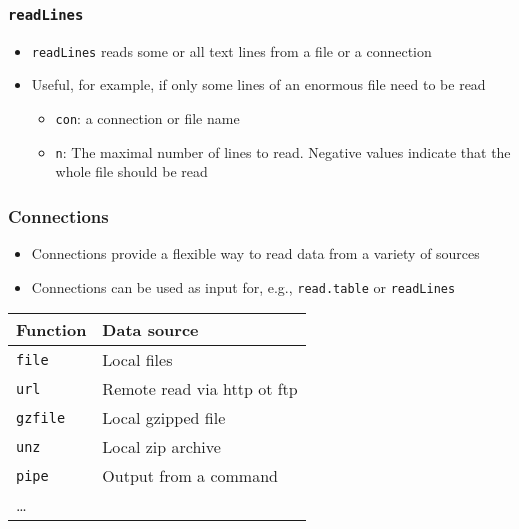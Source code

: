 \documentclass[paper=screen,mathserif]{beamer}\usepackage[]{graphicx}\usepackage[]{color}
\newcommand{\ft}[1]{\frametitle{#1}}
\begin{document}
\begin{frame}[fragile]
  \ft{{\tt readLines}}
  \begin{itemize}
  \item {\tt readLines} reads some or all text lines from a file or a
    connection
  \item Useful, for example, if only some lines of an enormous file
    need to be read
    \begin{itemize}
    \item {\tt con}: a connection or file name
    \item {\tt n}: The maximal number of lines to read. Negative
      values indicate that the whole file should be read
    \end{itemize}
  \end{itemize}
\end{frame}

\begin{frame}[fragile]
  \ft{Connections}
  \begin{itemize}
  \item Connections provide a flexible way to read data from a variety
    of sources
  \item Connections can be used as input for, e.g., {\tt read.table}
    or {\tt readLines}
  \end{itemize}
  \begin{center}
  \begin{tabular}{lp{7cm}}
    \toprule
    Function & Data source \\
    \midrule
    {\tt file} & Local files \\
    {\tt url} & Remote read via http ot ftp \\
    {\tt gzfile} & Local gzipped file \\
    {\tt unz} & Local zip archive \\
    {\tt pipe} & Output from a command \\
    \dots & \\
    \bottomrule
  \end{tabular}
\end{center}  
\end{frame}
\end{document}
